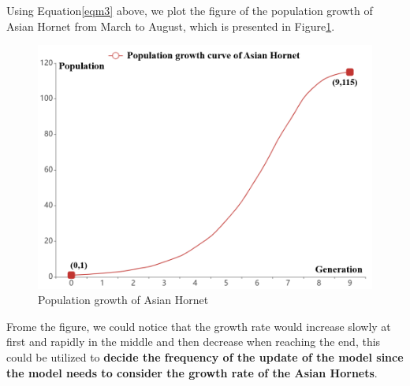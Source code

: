 \documentclass{mcmthesis}
\begin{document}
 	\quad Using Equation\ref{eqm3} above, we plot the figure of the population growth of Asian Hornet from March to August, which is presented in Figure\ref{p}.
 	\begin{figure}[h]
 		\centering
 		\includegraphics[scale=0.5]{after.png}
 		\caption{Population growth of Asian Hornet}
 		\label{p}
 	\end{figure}
 	Frome the figure, we could notice that the growth rate would increase slowly at first and rapidly in the middle and then decrease when reaching the end, this could be utilized to \textbf{decide the frequency of the update of the model since the model needs to consider the growth rate of the Asian Hornets}.
\end{document}
